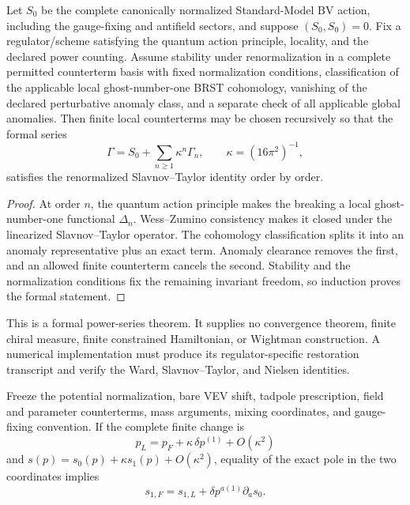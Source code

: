 \begin{theorem}
\label{thm:qft-q3-formal-st-restoration}
Let \(S_0\) be the complete canonically normalized Standard-Model BV action,
including the gauge-fixing and antifield sectors, and suppose
\((S_0,S_0)=0\). Fix a regulator/scheme satisfying the quantum action
principle, locality, and the declared power counting. Assume stability under
renormalization in a complete permitted counterterm basis with fixed
normalization conditions, classification of the applicable local
ghost-number-one BRST cohomology, vanishing of the declared perturbative
anomaly class, and a separate check of all applicable global anomalies. Then
finite local counterterms may be chosen recursively so that the formal series
\[
\Gamma=S_0+\sum_{n\ge1}\kappa^n\Gamma_n,\qquad
\kappa=(16\pi^2)^{-1},
\]
satisfies the renormalized Slavnov--Taylor identity order by order.
\end{theorem}

\begin{proof}
At order \(n\), the quantum action principle makes the breaking a local
ghost-number-one functional \(\Delta_n\). Wess--Zumino consistency makes it
closed under the linearized Slavnov--Taylor operator. The cohomology
classification splits it into an anomaly representative plus an exact term.
Anomaly clearance removes the first, and an allowed finite counterterm
cancels the second. Stability and the normalization conditions fix the
remaining invariant freedom, so induction proves the formal statement.
\end{proof}

\begin{remark}
This is a formal power-series theorem. It supplies no convergence theorem,
finite chiral measure, finite constrained Hamiltonian, or Wightman
construction. A numerical implementation must produce its regulator-specific
restoration transcript and verify the Ward, Slavnov--Taylor, and Nielsen
identities.
\end{remark}

\begin{lemma}
\label{lem:qft-q3-fj-reparametrization}
Freeze the potential normalization, bare VEV shift, tadpole prescription,
field and parameter counterterms, mass arguments, mixing coordinates, and
gauge-fixing convention. If the complete finite change is
\[
p_L=p_F+\kappa\,\delta p^{(1)}+O(\kappa^2)
\]
and \(s(p)=s_0(p)+\kappa s_1(p)+O(\kappa^2)\), equality of the exact pole in
the two coordinates implies
\[
s_{1,F}=s_{1,L}+\delta p^{a(1)}\partial_as_0.
\]
\end{lemma}

